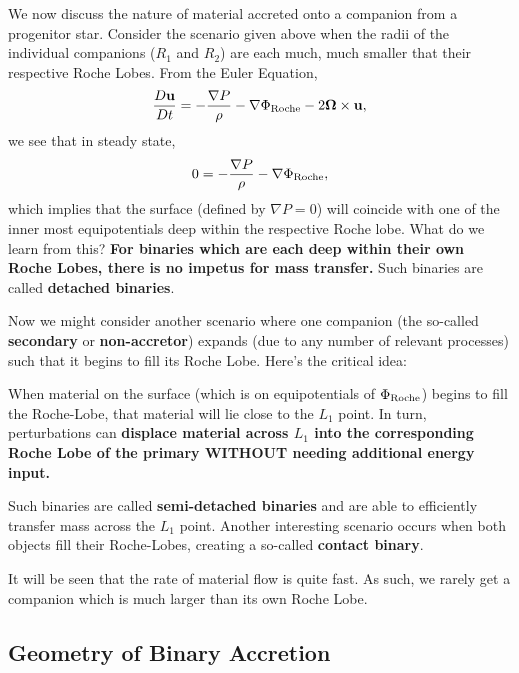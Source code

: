 We now discuss the nature of material accreted onto a companion from a progenitor star. Consider the scenario given above when the radii of the individual companions ($R_1$ and $R_2$) are each much, much smaller that their respective Roche Lobes. From the Euler Equation,
\[
\frac{D{\bf u}}{Dt} = - \frac{\nabla P}{\rho} - \nabla \Phi_{\rm Roche} - 2 \boldsymbol{\Omega} \times {\bf u},
\]
we see that in steady state,
\[
0 = - \frac{\nabla P}{\rho} - \nabla \Phi_{\rm Roche},
\]
which implies that the surface (defined by $\nabla P = 0$) will coincide with one of the inner most equipotentials deep within the respective Roche lobe. What do we learn from this? \textbf{For binaries which are each deep within their own Roche Lobes, there is no impetus for mass transfer.} Such binaries are called \textbf{detached binaries}.
\par
Now we might consider another scenario where one companion (the so-called \textbf{secondary} or \textbf{non-accretor}) expands (due to any number of relevant processes) such that it begins to fill its Roche Lobe. Here's the critical idea:
\vspace{0.25cm}
\begin{center}
    When material on the surface (which is on equipotentials of $\Phi_{\rm Roche}$) begins to fill the Roche-Lobe, that material will lie close to the $L_1$ point. In turn, perturbations can \textbf{displace material across $L_1$ into the corresponding Roche Lobe of the primary WITHOUT needing additional energy input.} 
\end{center}
\vspace{0.25cm}
Such binaries are called \textbf{semi-detached binaries} and are able to efficiently transfer mass across the $L_1$ point. Another interesting scenario occurs when both objects fill their Roche-Lobes, creating a so-called \textbf{contact binary}.
\begin{remark}
    It will be seen that the rate of material flow is quite fast. As such, we rarely get a companion which is much larger than its own Roche Lobe.
\end{remark}

\subsection{Geometry of Binary Accretion}

